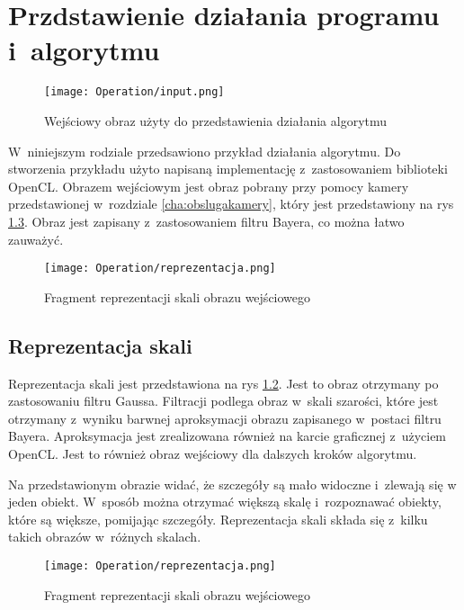 \chapter{Przdstawienie działania programu i~algorytmu}
\label{cha:dzialanie}

\begin{figure}[h]
\begin{center}
\texttt{[image: Operation/input.png]}
\end{center}
\caption{Wejściowy obraz użyty do przedstawienia działania algorytmu}
\label{fig:input}
\end{figure}

W~niniejszym rodziale przedsawiono przykład działania algorytmu. Do stworzenia przykładu użyto napisaną implementację z~zastosowaniem biblioteki OpenCL. Obrazem wejściowym jest obraz pobrany przy pomocy kamery przedstawionej w~rozdziale \ref{cha:obslugakamery}, który jest przedstawiony na rys \ref{fig:input}. Obraz jest zapisany z~zastosowaniem filtru Bayera, co można łatwo zauważyć.

\begin{figure}[h]
\begin{center}
\texttt{[image: Operation/reprezentacja.png]}
\end{center}
\caption{Fragment reprezentacji skali obrazu wejściowego}
\label{fig:dzialanieRep}
\end{figure}


\section{Reprezentacja skali}
\label{sec:dzialanieRep}

Reprezentacja skali jest przedstawiona na rys \ref{fig:dzialanieRep}. Jest to obraz otrzymany po zastosowaniu filtru Gaussa. Filtracji podlega obraz w~skali szarości, które jest otrzymany z~wyniku barwnej aproksymacji obrazu zapisanego w~postaci filtru Bayera. Aproksymacja jest zrealizowana również na karcie graficznej z~użyciem OpenCL. Jest to również obraz wejściowy dla dalszych kroków algorytmu.

Na przedstawionym obrazie widać, że szczegóły są mało widoczne i~zlewają się w jeden obiekt. W~sposób można otrzymać większą skalę i~rozpoznawać obiekty, które są większe, pomijając szczegóły. Reprezentacja skali składa się z~kilku takich obrazów w~różnych skalach.

\begin{figure}[h]
\begin{center}
\texttt{[image: Operation/reprezentacja.png]}
\end{center}
\caption{Fragment reprezentacji skali obrazu wejściowego}
\label{fig:input}
\end{figure}

